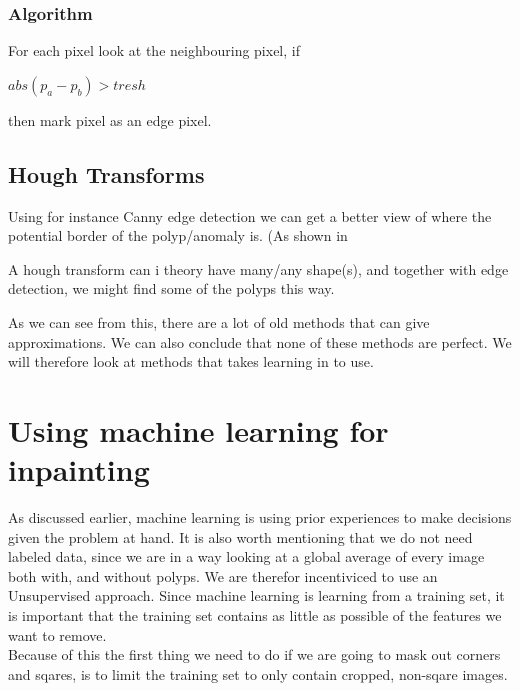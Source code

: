 	    \subsubsection{Algorithm}
	      For each pixel look at the neighbouring pixel, if \\
	      
	      \begin{centering} 
		$ abs(p_a - p_b)>tresh $\\ 
	      \end{centering}
	      
	      then mark pixel as an edge pixel. \\
	      
	  \subsection{Hough Transforms}
	    Using for instance Canny edge detection %
	    we can get a better view of where the potential border of the polyp/anomaly is. (As shown in %
	    
	    A hough transform can i theory have many/any shape(s), and together with edge detection, we might find some of the polyps this way.
	    
    
    
    
    
    
	
    As we can see from this, there are a lot of old methods that can give approximations. We can also conclude that none of these methods are perfect.
    We will therefore look at methods that takes learning in to use.
\section{Using machine learning for inpainting}
    As discussed earlier, machine learning is using prior experiences to make decisions given the problem at hand. 
    It is also worth mentioning that we do not need labeled data, since we are in a way looking at a global average of every image both with, and without polyps. We are therefor incentiviced to use an 
    Unsupervised approach.
    Since machine learning is learning from a training set, it is important that the training set contains as little as possible of the features we want to remove. \\
    
    Because of this the first thing we need to do if we are going to mask out corners and sqares, is to limit the training set to only contain cropped, non-sqare images. 
 
